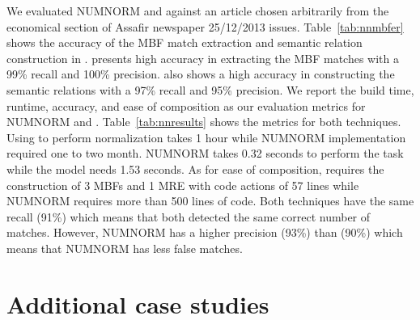 \begin{appendices}
We evaluated NUMNORM and \framework against an article chosen arbitrarily from the economical section 
of Assafir newspaper 25/12/2013 issues. 
Table~\ref{tab:nnmbfer} shows the accuracy of the MBF match extraction and semantic relation construction in \framework. 
\framework presents high accuracy in extracting the MBF matches with a 99\% recall and 100\% precision. 
\framework also shows a high accuracy in constructing the semantic relations with a 97\% recall and 95\% precision. 
We report the build time, runtime, accuracy, and ease of composition as our evaluation metrics for NUMNORM and \framework. 
Table~\ref{tab:nnresults} shows the metrics for both techniques. 
Using \framework to perform normalization takes 1 hour while NUMNORM implementation required one to two month. 
NUMNORM takes 0.32 seconds to perform the task while the \framework model needs 1.53 seconds. 
As for ease of composition, \framework requires the construction of 3 MBFs and 1 
MRE with code actions of 57 lines while NUMNORM requires more than 500 lines of code. 
Both techniques have the same recall (91\%) which means that both detected the same correct number of matches. 
However, NUMNORM has a higher precision (93\%) than \framework (90\%) which means that NUMNORM has less false matches.

\newpage 
\section{Additional case studies}
\label{a:cases}

\end{appendices}




